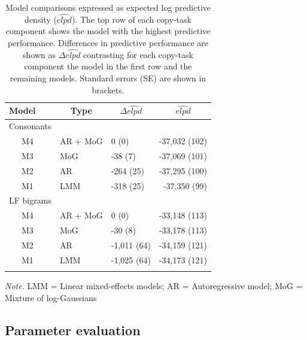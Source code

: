 \documentclass[
  english,
  man,mask,floatsintext]{apa7}
\begin{document}
\begin{table}[bp!]

\begin{center}
\begin{threeparttable}

\caption{\label{tab:modelcomparisons}Model comparisons expressed as expected log predictive density ($\widehat{elpd}$). The top row of each copy-task component shows the model with the highest predictive performance. Differences in predictive performance are shown as $\Delta\widehat{elpd}$ contrasting for each copy-task component the model in the first row and the remaining models. Standard errors (SE) are shown in brackets.}

\begin{tabular}{lllr}
\toprule
Model & \multicolumn{1}{c}{Type} & \multicolumn{1}{c}{$\Delta\widehat{elpd}$} & \multicolumn{1}{c}{$\widehat{elpd}$}\\
\midrule
Consonants &  &  & \\
\ \ \ M4 & AR + MoG & 0 (0) & -37,032 (102)\\
\ \ \ M3 & MoG & -38 (7) & -37,069 (101)\\
\ \ \ M2 & AR & -264 (25) & -37,295 (100)\\
\ \ \ M1 & LMM & -318 (25) & -37,350 (99)\\
LF bigrams &  &  & \\
\ \ \ M4 & AR + MoG & 0 (0) & -33,148 (113)\\
\ \ \ M3 & MoG & -30 (8) & -33,178 (113)\\
\ \ \ M2 & AR & -1,011 (64) & -34,159 (121)\\
\ \ \ M1 & LMM & -1,025 (64) & -34,173 (121)\\
\bottomrule
\addlinespace
\end{tabular}

\begin{tablenotes}[para]
\normalsize{\textit{Note.} LMM = Linear mixed-effects models; AR = Autoregressive model; MoG = Mixture of log-Gaussians}
\end{tablenotes}

\end{threeparttable}
\end{center}

\end{table}

\hypertarget{parameter-evaluation}{%
\subsection{Parameter evaluation}\label{parameter-evaluation}}
\end{document}
